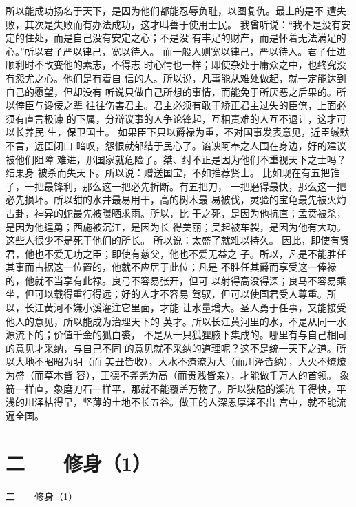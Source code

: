 \documentclass[12pt,UTF8]{ctexbook}
\begin{document}
所以能成功扬名于天下，是因为他们都能忍辱负耻，以图复仇。最上的是不 
遭失败，其次是失败而有办法成功，这才叫善于使用士民。 
我曾听说：“我不是没有安定的住处，而是自己没有安定之心；不是没 
有丰足的财产，而是怀着无法满足的心。”所以君子严以律己，宽以待人。 
而一般人则宽以律己，严以待人。君子仕进顺利时不改变他的素志，不得志 
时心情也一样；即使杂处于庸众之中，也终究没有怨尤之心。他们是有着自 
信的人。所以说，凡事能从难处做起，就一定能达到自己的愿望，但却没有 
听说只做自己所想的事情，而能免于所厌恶之后果的。所以倖臣与谗佞之辈 
往往伤害君主。君主必须有敢于矫正君主过失的臣僚，上面必须有直言极谏 
的下属，分辩议事的人争论锋起，互相责难的人互不退让，这才可以长养民 
生，保卫国土。 
如果臣下只以爵禄为重，不对国事发表意见，近臣缄默不言，远臣闭口 
暗叹，怨恨就郁结于民心了。谄谀阿奉之人围在身边，好的建议被他们阻障 
难进，那国家就危险了。桀、纣不正是因为他们不重视天下之士吗？结果身 
被杀而失天下。所以说：赠送国宝，不如推荐贤士。 
比如现在有五把锥子，一把最锋利，那么这一把必先折断。有五把刀， 
一把磨得最快，那么这一把必先损坏。所以甜的水井最易用干，高的树木最 
易被伐，灵验的宝龟最先被火灼占卦，神异的蛇最先被曝晒求雨。所以，比 
干之死，是因为他抗直；孟贲被杀，是因为他逞勇；西施被沉江，是因为长 
得美丽；吴起被车裂，是因为他有大功。这些人很少不是死于他们的所长。 
所以说：太盛了就难以持久。 
因此，即使有贤君，他也不爱无功之臣；即使有慈父，他也不爱无益之 
子。所以，凡是不能胜任其事而占据这一位置的，他就不应居于此位；凡是 
不胜任其爵而享受这一俸禄的，他就不当享有此禄。良弓不容易张开，但可 
以射得高没得深；良马不容易乘坐，但可以载得重行得远；好的人才不容易 
驾驭，但可以使国君受人尊重。所以，长江黄河不嫌小溪灌注它里面，才能 
让水量增大。圣人勇于任事，又能接受他人的意见，所以能成为治理天下的 
英才。所以长江黄河里的水，不是从同一水源流下的；价值千金的狐白裘， 
不是从一只狐狸腋下集成的。哪里有与自己相同的意见才采纳，与自己不同 
的意见就不采纳的道理呢？这不是统一天下之道。所以大地不昭昭为明（而 
美丑皆收），大水不潦潦为大（而川泽皆纳），大火不燎燎为盛（而草木皆 
容），王德不尧尧为高（而贵贱皆亲），才能做千万人的首领。 
象箭一样直，象磨刀石一样平，那就不能覆盖万物了。所以狭隘的溪流 
干得快，平浅的川泽枯得早，坚薄的土地不长五谷。做王的人深恩厚泽不出 
宫中，就不能流遍全国。 


\chapter{二　　修身（1）}

二　　修身（1）
\end{document}
